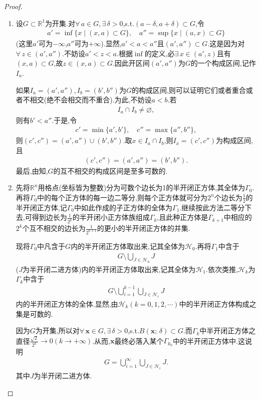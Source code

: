 \documentclass[../../main.tex]{subfiles}%
\begin{document}
\begin{proof}
\begin{enumerate}[(1)]
\item 设$G\subset\mathbb{R}^1$为开集.对$\forall\,a\in G,\exists\,\delta>0$,s.t.$(a-\delta,a+\delta)\subset G$,令
\begin{align*}
a'=\inf\{x\mid (x,a)\subset G\},\quad a''=\sup\{x\mid (a,x)\subset G\}
\end{align*}
(这里$a'$可为$-\infty$,$a''$可为$+\infty$).显然,$a'<a<a''$且$(a',a'')\subset G$.这是因为对$\forall\,z\in(a',a'')$.不妨设$a'<z<a$.根据$\inf$的定义,必$\exists\,x\in(a',z)$且有$(x,a)\subset G$,故$z\in(x,a)\subset G$.因此开区间$(a',a'')$为$G$的一个构成区间,记作$I_a$.

如果$I_a=(a',a''),I_b=(b',b'')$为$G$的构成区间,则可以证明它们或者重合或者不相交(绝不会相交而不重合).为此,不妨设$a<b$.若
\begin{align*}
I_a\cap I_b\neq\varnothing,
\end{align*}
则有$b'<a''$.于是,令
\begin{align*}
c'=\min\{a',b'\},\quad c''=\max\{a'',b''\},
\end{align*}
则$(c',c'')=(a',a'')\cup(b',b'')$.取$x\in I_a\cap I_b$,则$I_x=(c',c'')$为构成区间,且
\begin{align*}
(c',c'')=(a',a'')=(b',b'').
\end{align*}
最后,由知,$G$的互不相交的构成区间是至多可数的.

\item 先将$\mathbb{R}^n$用格点(坐标皆为整数)分为可数个边长为1的半开闭正方体,其全体为$\Gamma_0$.再将$\Gamma_0$中的每个正方体的每一边二等分,则每个正方体就可分为$2^n$个边长为$\frac{1}{2}$的半开闭正方体,记$\Gamma_0$中如此作成的子正方体的全体为$\Gamma_1$.继续按此方法二等分下去,可得到边长为$\frac{1}{2^k}$的半开闭小正方体族组成$\Gamma_k$,且此种正方体是$\Gamma_{k+1}$中相应的$2^k$个互不相交的边长为$\frac{1}{2^{k+1}}$的更小的半开闭正方体的并集.

现将$\Gamma_0$中凡含于$G$内的半开闭正方体取出来,记其全体为$\mathscr{H}_0$.再将$\Gamma_1$中含于
\begin{align*}
G\setminus\bigcup_{J\in\mathscr{H}_0}J
\end{align*}
($J$为半开闭二进方体)内的半开闭正方体取出来,记其全体为$\mathscr{H}_1$.依次类推,$\mathscr{H}_k$为$\Gamma_k$中含于
\begin{align*}
G\setminus\bigcup_{i=1}^{k-1}\bigcup_{J\in\mathscr{H}_i}J
\end{align*}
内的半开闭正方体的全体.显然,由$\mathscr{H}_k(k=0,1,2,\cdots)$中的半开闭正方体构成之集是可数的.

因为$G$为开集,所以对$\forall\,\boldsymbol{x}\in G,\exists\,\delta>0$,s.t.$B(\boldsymbol{x};\,\delta)\subset G$.而$\Gamma_k$中半开闭正方体之直径$\frac{\sqrt{2}}{2^k}\to0(k\to+\infty)$.从而,$\boldsymbol{x}$最终必落入某个$\Gamma_{k_0}$中的半开闭正方体中.这说明
\begin{align*}
G=\bigcup_{i=1}^{\infty}\bigcup_{J\in\mathscr{H}_i}J.
\end{align*}
其中$J$为半开闭二进方体.
\end{enumerate}

\end{proof}
\end{document}
